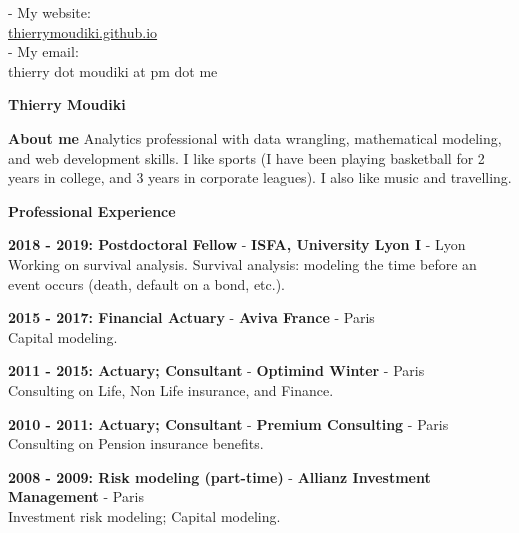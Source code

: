 \documentclass[a4paper,12pt,final]{memoir}
\newcommand{\Sep}{\vspace{1.5em}}
\newcommand{\SmallSep}{\vspace{0.5em}}
\newenvironment{AboutMe}
	{\ignorespaces\textbf{\color{Blue} About me}}
	{\Sep\ignorespacesafterend}
\newcommand{\CVSection}[1]
	{\Large\textbf{#1}\par
	\SmallSep\normalsize\normalfont}
\newcommand{\CVItem}[1]
	{\textbf{\color{Blue} #1}}
\begin{document}
 \begin{flushright}\small
 
  - My website: \\
    \url{thierrymoudiki.github.io}\\
 	- My email: \\ 
 	  thierry dot moudiki at pm dot me
 \end{flushright}\normalsize
\framebreak


\Huge\bfseries {\color{Blue} Thierry Moudiki} \\

\normalsize\normalfont

\begin{AboutMe}
Analytics professional with data wrangling, mathematical modeling, and web development skills. I like sports (I have been playing basketball for 2 years in college, and 3 years in corporate leagues). I also like music and travelling.
\end{AboutMe}

\CVSection{Professional Experience}

\CVItem{2018 - 2019: Postdoctoral Fellow} - \textbf{ISFA, University Lyon I} - Lyon\\
Working on survival analysis. Survival analysis: modeling the time before an event occurs (death, default on a bond, etc.). 

\CVItem{2015 - 2017: Financial Actuary} - \textbf{Aviva France} - Paris\\
Capital modeling.

\CVItem{2011 - 2015: Actuary; Consultant} - \textbf{Optimind Winter} - Paris\\
Consulting on Life, Non Life insurance, and Finance. 

\CVItem{2010 - 2011: Actuary; Consultant} - \textbf{Premium Consulting} - Paris\\
Consulting on Pension insurance benefits. 

\CVItem{2008 - 2009: Risk modeling (part-time)} - \textbf{Allianz Investment Management} - Paris\\
Investment risk modeling; Capital modeling. 
\end{document}
